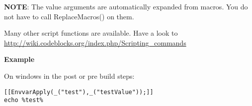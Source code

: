 \textbf{NOTE}: The value arguments are automatically expanded from macros. You do not have to call ReplaceMacros() on them.

Many other script functions are available. Have a look to \url{http://wiki.codeblocks.org/index.php/Scripting_commands}

\textbf{Example}

On windows in the post or pre build steps:
\begin{lstlisting}
[[EnvvarApply(_("test"),_("testValue"));]]
echo %test%
\end{lstlisting}

